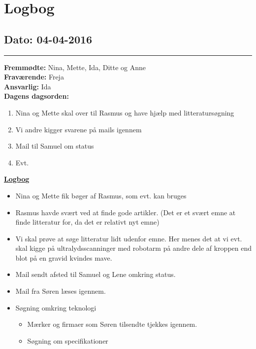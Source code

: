 \chapter{Logbog}
\section{Dato: 04-04-2016}
\hrule
\textbf{Fremmødte:} Nina, Mette, Ida, Ditte og Anne \\
\textbf{Fraværende:} Freja \\
\textbf{Ansvarlig:} Ida  \\
\textbf{Dagens dagsorden: }
\begin{enumerate}
	\item Nina og Mette skal over til Rasmus og have hjælp med litteratursøgning
	\item Vi andre kigger svarene på mails igennem
	\item Mail til Samuel om status 
	\item Evt. 
\end{enumerate}

\underline{\textbf{Logbog}}
\begin{itemize}
\item Nina og Mette fik bøger af Rasmus, som evt. kan bruges
\item Rasmus havde svært ved at finde gode artikler. (Det er et svært emne at finde litteratur for, da det er relativt nyt emne)
\item Vi skal prøve at søge litteratur lidt udenfor emne. Her menes det at vi evt. skal kigge på ultralydsscanninger med robotarm på andre dele af kroppen end blot på en gravid kvindes mave.
\end{itemize}
\begin{itemize}
\item Mail sendt afsted til Samuel og Lene omkring status.
\item Mail fra Søren læses igennem. 
\item Søgning omkring teknologi
\begin{itemize}
\item Mærker og firmaer som Søren tilsendte tjekkes igennem.
\item Søgning om specifikationer
\end{itemize}
\end{itemize}
\newpage